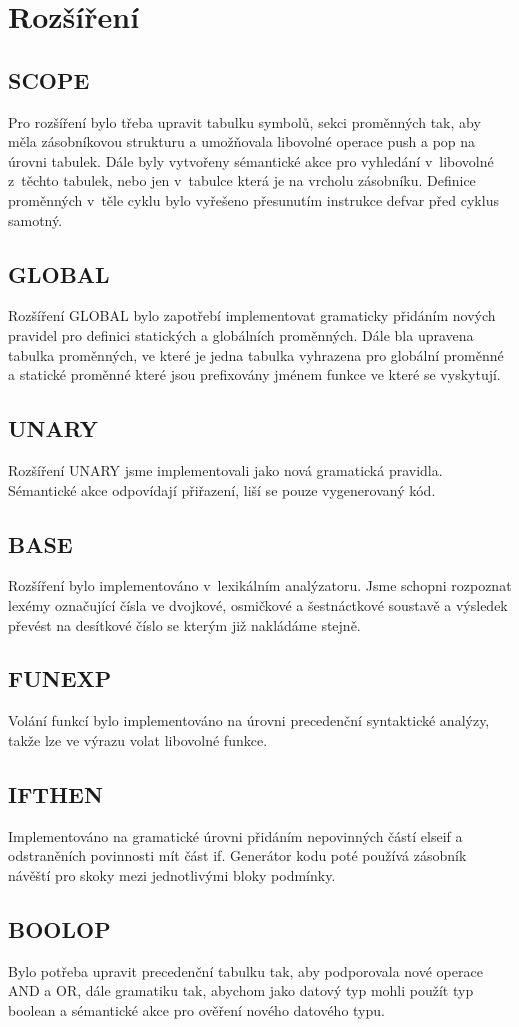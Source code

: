 \section{Rozšíření}

\subsection{SCOPE}
Pro rozšíření bylo třeba upravit tabulku symbolů, sekci proměnných tak, aby
měla zásobníkovou strukturu a umožňovala libovolné operace push a pop na úrovni tabulek.
Dále byly vytvořeny sémantické akce pro vyhledání v~libovolné z~těchto tabulek,
nebo jen v~tabulce která je na vrcholu zásobníku. Definice proměnných v~těle cyklu
bylo vyřešeno přesunutím instrukce defvar před cyklus samotný.

\subsection{GLOBAL}
Rozšíření GLOBAL bylo zapotřebí implementovat gramaticky přidáním
nových pravidel pro definici statických a globálních proměnných.
Dále bla upravena tabulka proměnných, ve které je jedna tabulka vyhrazena
pro globální proměnné a statické proměnné které jsou prefixovány
jménem funkce ve které se vyskytují.

\subsection{UNARY}
Rozšíření UNARY jsme implementovali jako nová gramatická pravidla. Sémantické
akce odpovídají přiřazení, liší se pouze vygenerovaný kód.

\subsection{BASE}
Rozšíření bylo implementováno v~lexikálním analýzatoru. Jsme schopni rozpoznat
lexémy označující čísla ve dvojkové, osmičkové a šestnáctkové soustavě a
výsledek převést na desítkové číslo se kterým již nakládáme stejně.

\subsection{FUNEXP}
Volání funkcí bylo implementováno na úrovni precedenční syntaktické analýzy,
takže lze ve výrazu volat libovolné funkce.

\subsection{IFTHEN}
Implementováno na gramatické úrovni přidáním nepovinných částí
elseif a odstraněních povinnosti mít část if. Generátor kodu poté používá zásobník návěští pro skoky mezi jednotlivými bloky podmínky.

\subsection{BOOLOP}
Bylo potřeba upravit precedenční tabulku tak, aby podporovala nové
operace AND a OR, dále gramatiku tak, abychom jako datový typ mohli
použít typ boolean a sémantické akce pro ověření nového datového typu.
